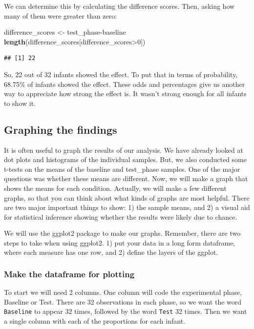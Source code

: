 \documentclass[]{book}
\newenvironment{Shaded}{\begin{snugshade}}{\end{snugshade}}
\newcommand{\KeywordTok}[1]{\textcolor[rgb]{0.13,0.29,0.53}{\textbf{{#1}}}}
\newcommand{\DecValTok}[1]{\textcolor[rgb]{0.00,0.00,0.81}{{#1}}}
\newcommand{\StringTok}[1]{\textcolor[rgb]{0.31,0.60,0.02}{{#1}}}
\newcommand{\NormalTok}[1]{{#1}}
\theoremstyle{definition}
\theoremstyle{definition}
\theoremstyle{definition}
\theoremstyle{remark}
\begin{document}
We can determine this by calculating the difference scores. Then, asking
how many of them were greater than zero:

\begin{Shaded}
\begin{Highlighting}[]
\NormalTok{difference_scores <-}\StringTok{ }\NormalTok{test_phase-baseline}
\KeywordTok{length}\NormalTok{(difference_scores[difference_scores>}\DecValTok{0}\NormalTok{])}
\end{Highlighting}
\end{Shaded}

\begin{verbatim}
## [1] 22
\end{verbatim}

So, 22 out of 32 infants showed the effect. To put that in terms of
probability, 68.75\% of infants showed the effect. These odds and
percentages give us another way to appreciate how strong the effect is.
It wasn't strong enough for all infants to show it.

\subsection{Graphing the findings}\label{graphing-the-findings}

It is often useful to graph the results of our analysis. We have already
looked at dot plots and histograms of the individual samples. But, we
also conducted some t-tests on the means of the baseline and test\_phase
samples. One of the major questions was whether these means are
different. Now, we will make a graph that shows the means for each
condition. Actually, we will make a few different graphs, so that you
can think about what kinds of graphs are most helpful. There are two
major important things to show: 1) the sample means, and 2) a visual aid
for statistical inference showing whether the results were likely due to
chance.

We will use the ggplot2 package to make our graphs. Remember, there are
two steps to take when using ggplot2. 1) put your data in a long form
dataframe, where each measure has one row, and 2) define the layers of
the ggplot.

\subsubsection{Make the dataframe for
plotting}\label{make-the-dataframe-for-plotting}

To start we will need 2 columns. One column will code the experimental
phase, Baseline or Test. There are 32 observations in each phase, so we
want the word \texttt{Baseline} to appear 32 times, followed by the word
\texttt{Test} 32 times. Then we want a single column with each of the
proportions for each infant.
\end{document}
